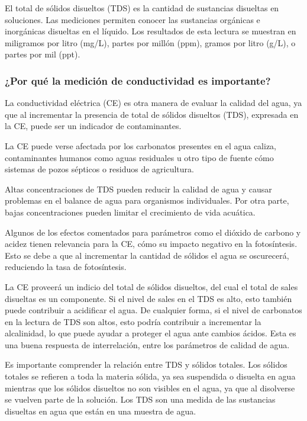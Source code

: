 El total de sólidos disueltos (TDS) es la cantidad de sustancias disueltas en soluciones. Las mediciones permiten conocer las sustancias orgánicas e inorgánicas disueltas en el líquido. 
Los resultados de esta lectura se muestran en miligramos por litro (mg/L), partes por mill\'on (ppm), gramos por litro (g/L), o partes por mil (ppt).

\subsubsection{¿Por qu\'e la medici\'on de conductividad es importante?}
La conductividad eléctrica (CE) es otra manera de evaluar la calidad del agua, ya que al incrementar la presencia de total de sólidos disueltos (TDS), expresada en la CE, puede ser un indicador de contaminantes. 

La CE puede verse afectada por los carbonatos presentes en el agua caliza, contaminantes humanos como aguas residuales u otro tipo de fuente cómo sistemas de pozos sépticos o residuos de agricultura.

Altas concentraciones de TDS pueden reducir la calidad de agua y causar problemas en el balance de agua para organismos individuales. 
Por otra parte, bajas concentraciones pueden limitar el crecimiento de vida acuática. 

Algunos de los efectos comentados para parámetros como el dióxido de carbono y acidez tienen relevancia para la CE, cómo su impacto negativo en la fotosíntesis. 
Esto se debe a que al incrementar la cantidad de sólidos el agua se oscurecerá, reduciendo la tasa de fotosíntesis. 

La CE proveerá un indicio del total de sólidos disueltos, del cual el total de sales disueltas es un componente. Si el nivel de sales en el TDS es alto, esto también puede contribuir a acidificar el agua. 
De cualquier forma, si el nivel de carbonatos en la lectura de TDS son altos, esto podría contribuir a incrementar la alcalinidad, lo que puede ayudar a proteger el agua ante cambios ácidos. 
Esta es una buena respuesta de interrelación, entre los parámetros de calidad de agua.

Es importante comprender la relación entre TDS y sólidos totales. Los sólidos totales se refieren a toda la materia sólida, ya sea suspendida o disuelta en agua mientras que los sólidos disueltos no son visibles en el agua, ya que al disolverse se vuelven parte de la solución. 
Los TDS son una medida de las sustancias disueltas en agua que están en una muestra de agua. 

